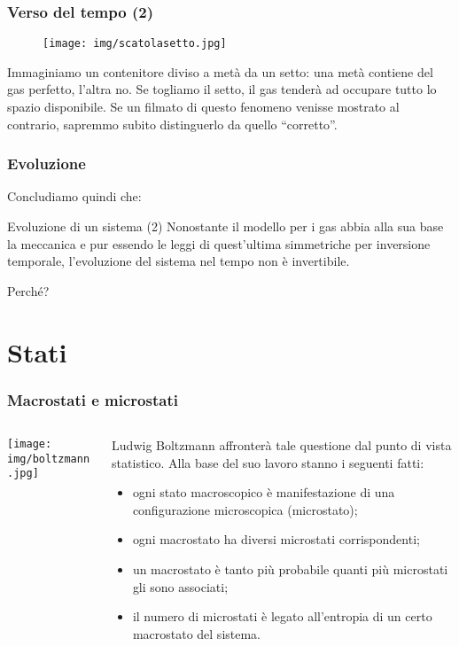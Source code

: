 \documentclass[]{beamer}
\theoremstyle{plain}
\begin{document}
\begin{frame}
  \frametitle{Verso del tempo (2)}
  
\begin{figure}
\texttt{[image: img/scatolasetto.jpg]}  
\end{figure}  
Immaginiamo un contenitore diviso a metà da un setto: una metà contiene del gas perfetto, l'altra no. Se togliamo il setto, il gas tenderà ad occupare tutto lo spazio disponibile.{\pause} Se un filmato di questo fenomeno venisse mostrato al contrario, sapremmo subito distinguerlo da quello ``corretto''.
\end{frame}

\begin{frame}
  \frametitle{Evoluzione}  
Concludiamo quindi che:
\begin{block}{Evoluzione di un sistema (2)}
Nonostante il modello per i gas abbia alla sua base la meccanica e pur essendo le leggi di quest'ultima simmetriche per inversione temporale, l'evoluzione del sistema nel tempo non è invertibile.
\end{block}\pause
Perché?

\end{frame}



\section{Stati}


\begin{frame}
\frametitle{Macrostati e microstati}
\begin{columns}
\begin{column}{0.3\textwidth}
\texttt{[image: img/boltzmann.jpg]}
\end{column}
\begin{column}{0.7\textwidth}
Ludwig Boltzmann affronterà tale questione dal punto di vista statistico. Alla base del suo lavoro stanno i seguenti fatti:\pause
\begin{itemize}
\item<2-> ogni stato macroscopico è manifestazione di una configurazione microscopica (microstato);
\item<3-> ogni macrostato ha diversi microstati corrispondenti;
\item<4-> un macrostato è tanto più probabile quanti più microstati gli sono associati;
\item<5-> il numero di microstati è legato all'entropia di un certo macrostato del sistema.
\end{itemize}
\end{column}
\end{columns}
\end{frame}
\end{document}
